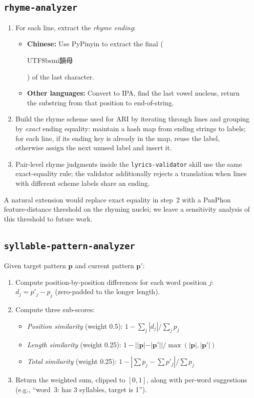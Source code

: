 \documentclass[11pt]{article}
\begin{document}
\subsection{\texttt{rhyme-analyzer}}
\label{app:tools-rhyme}

\begin{enumerate}
    \item For each line, extract the \emph{rhyme ending}:
    \begin{itemize}
        \item \textbf{Chinese:} Use PyPinyin to extract the final (\begin{CJK}{UTF8}{bsmi}韻母\end{CJK}) of the last character.
        \item \textbf{Other languages:} Convert to IPA, find the last vowel nucleus, return the substring from that position to end-of-string.
    \end{itemize}
    \item Build the rhyme scheme used for ARI by iterating through lines and grouping by \emph{exact} ending equality: maintain a hash map from ending strings to labels; for each line, if its ending key is already in the map, reuse the label, otherwise assign the next unused label and insert it.
    \item Pair-level rhyme judgments inside the \texttt{lyrics-validator} skill use the same exact-equality rule; the validator additionally rejects a translation when lines with different scheme labels share an ending.
\end{enumerate}
A natural extension would replace exact equality in step~2 with a PanPhon \citep{mortensen-etal-2016-panphon} feature-distance threshold on the rhyming nuclei; we leave a sensitivity analysis of this threshold to future work.

\subsection{\texttt{syllable-pattern-\allowbreak{}analyzer}}
\label{app:tools-pattern}

Given target pattern $\mathbf{p}$ and current pattern $\mathbf{p}'$:
\begin{enumerate}
    \item Compute position-by-position differences for each word position $j$: $d_j = p'_j - p_j$ (zero-padded to the longer length).
    \item Compute three sub-scores:
    \begin{itemize}
        \item \emph{Position similarity} (weight 0.5): $1 - \sum_j |d_j| / \sum_j p_j$
        \item \emph{Length similarity} (weight 0.25): $1 - ||\mathbf{p}| - |\mathbf{p}'|| / \max(|\mathbf{p}|, |\mathbf{p}'|)$
        \item \emph{Total similarity} (weight 0.25): $1 - |\sum p_j - \sum p'_j| / \sum p_j$
    \end{itemize}
    \item Return the weighted sum, clipped to $[0, 1]$, along with per-word suggestions (e.g., ``word~3: has 3 syllables, target is 1'').
\end{enumerate}
\end{document}
